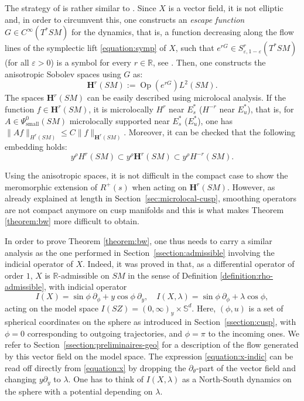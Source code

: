 \documentclass[10pt]{amsart}
\newcommand{\bH}{\boldsymbol{H}}
\newcommand{\R}{\mathbb{R}}
\newcommand{\Ss}{\mathbb{S}}
\newcommand{\eps}{\varepsilon}
\newcommand{\ZZ}{I(SZ)}
\DeclareMathOperator{\Op}{Op}
\theoremstyle{plain}
\theoremstyle{definition}
\begin{document}
The strategy of \cite{Bonthonneau-Weich-17} is rather similar to \cite{Faure-Sjostrand-11}. Since $X$ is a vector field, it is not elliptic and, in order to circumvent this, one constructs an \emph{escape function} $G \in C^\infty(T^*SM)$ for the dynamics, that is, a function decreasing along the flow lines of the symplectic lift \eqref{equation:symp} of $X$, such that $e^{rG} \in S^{r}_{\eps,1-\eps}(T^*SM)$ (for all $\eps > 0$) is a symbol for every $r\in\R$, see \cite[Lem.\,2.3]{Bonthonneau-Weich-17}. Then, one constructs the anisotropic Sobolev spaces using $G$ as:
\[
\bH^r(SM) := \Op(e^{rG})L^2(SM).
\]
The spaces $\bH^r(SM)$ can be easily described using microlocal analysis. If the function $f \in \bH^r(SM)$, it is microlocally $H^r$ near $E_s^*$ (\resp $H^{-r}$ near $E_u^*$), that is, for $A \in \Psi^0_{\mathrm{small}}(SM)$ microlocally supported near $E_s^*$ (\resp $E_u^*$), one has $\|Af\|_{H^r(SM)} \leq C \|f\|_{\bH^r(SM)}$. Moreover, it can be checked that the following embedding holds:
\begin{equation}
\label{equation:embedding-plot}
y^\rho H^r(SM) \subset y^\rho \bH^r(SM) \subset y^\rho H^{-r}(SM).
\end{equation}

Using the anisotropic spaces, it is not difficult in the compact case to show the meromorphic extension of $R^+(s)$ when acting on $\bH^r(SM)$. However, as already explained at length in Section~\ref{sec:microlocal-cusp}, smoothing operators are not compact anymore on cusp manifolds and this is what makes Theorem \ref{theorem:bw} more difficult to obtain.

In order to prove Theorem \ref{theorem:bw}, one thus needs to carry a similar analysis as the one performed in Section~\ref{ssection:admissible} involving the indicial operator of $X$. Indeed, it was proved in \cite{Bonthonneau-Weich-17} that, as a differential operator of order $1$, $X$ is $\R$-admissible on $SM$ in the sense of Definition \ref{definition:rho-admissible}, with indicial operator
\begin{equation}
\label{equation:x-indic}
I(X) =\sin\phi~\partial_\phi + y\cos\phi~\partial_y,\quad I(X,\lambda) = \sin\phi~\partial_\phi + \lambda \cos\phi,
\end{equation}
acting on the model space $\ZZ = (0,\infty)_y \times \Ss^d$. Here, $(\phi,u)$ is a set of spherical coordinates on the sphere as introduced in Section~\ref{ssection:cusp}, with $\phi=0$ corresponding to outgoing trajectories, and $\phi=\pi$ to the incoming ones. We refer to Section~\ref{ssection:preliminaires-geo} for a description of the flow generated by this vector field on the model space. The expression \eqref{equation:x-indic} can be read off directly from \eqref{equation:x} by dropping the $\partial_\theta$-part of the vector field and changing $y\partial_y$ to $\lambda$. One has to think of $I(X,\lambda)$ as a North-South dynamics on the sphere with a potential depending on $\lambda$.
\end{document}
